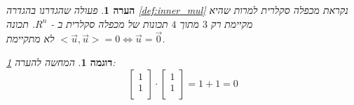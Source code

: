 \documentclass[12pt,leqno]{article}
\theoremstyle{theoremdd}
\newtheorem{example}{דוגמה}[section]
\newtheorem{comm}{הערה}[section]
\begin{document}
\begin{comm}
    \label{comm:not_really_inner_mul}
    פעולה שהגדרנו 
    בהגדרה 
    \ref{def:inner_mul}
    נקראת 
    מכפלה סקלרית
    למרות שהיא
    מקיימת רק 
    $3$
    מתוך 
    $4$
    תכונות של מכפלה סקלרית ב
    -
    $R^n$.   
    תכונה 
    $<\vec{u},\vec{u}> = 0 \Leftrightarrow \vec{u} = \vec{0} $
    לא מתקיימת.
\end{comm}
\begin{example}
    המחשה להערה
\ref{comm:not_really_inner_mul}:
\[
    \begin{bmatrix}
    1 \\
    1 \\
    \end{bmatrix}    
    \cdot 
    \begin{bmatrix}
    1 \\
    1 \\
    \end{bmatrix} 
    = 1 + 1 = 0
\]
\end{example}
\end{document}
